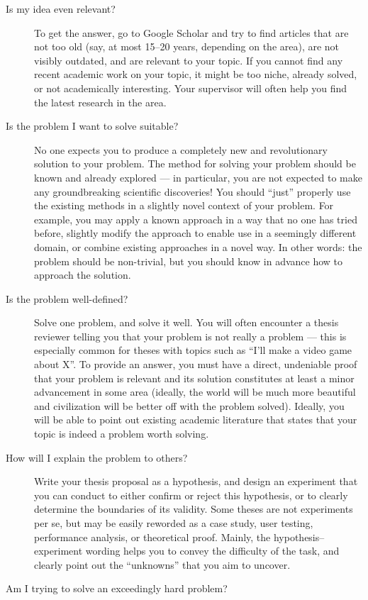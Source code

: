 \begin{description}
\item[Is my idea even relevant?]
To get the answer, go to Google Scholar and try to find articles that are not too old (say, at most 15--20 years, depending on the area), are not visibly outdated, and are relevant to your topic. If you cannot find any recent academic work on your topic, it might be too niche, already solved, or not academically interesting. Your supervisor will often help you find the latest research in the area.
\item[Is the problem I want to solve suitable?]
No one expects you to produce a completely new and revolutionary solution to your problem. The method for solving your problem should be known and already explored --- in particular, you are not expected to make any groundbreaking scientific discoveries! You should ``just'' properly use the existing methods in a slightly novel context of your problem. For example, you may apply a known approach in a way that no one has tried before, slightly modify the approach to enable use in a seemingly different domain, or combine existing approaches in a novel way. In other words: the problem should be non-trivial, but you should know in advance how to approach the solution.
\item[Is the problem well-defined?]
Solve one problem, and solve it well. You will often encounter a thesis reviewer telling you that your problem is not really a problem --- this is especially common for theses with topics such as ``I'll make a video game about X''. To provide an answer, you must have a direct, undeniable proof that your problem is relevant and its solution constitutes at least a minor advancement in some area (ideally, the world will be much more beautiful and civilization will be better off with the problem solved). Ideally, you will be able to point out existing academic literature that states that your topic is indeed a problem worth solving.
\item[How will I explain the problem to others?]
Write your thesis proposal as a hypothesis, and design an experiment that you can conduct to either confirm or reject this hypothesis, or to clearly determine the boundaries of its validity. Some theses are not experiments per se, but may be easily reworded as a case study, user testing, performance analysis, or theoretical proof. Mainly, the hypothesis--experiment wording helps you to convey the difficulty of the task, and clearly point out the ``unknowns'' that you aim to uncover.
\item[Am I trying to solve an exceedingly hard problem?]

\end{description}
